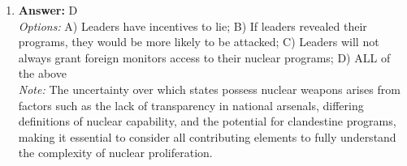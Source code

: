 \documentclass[12pt]{article}
\begin{document}
\begin{enumerate}[label=\arabic*.]
\\ \textit{Note:} The State Department is the primary federal agency responsible for overseeing and implementing U.S. foreign policy, making it the correct answer for this question.
\item \textbf{Answer:} D
\\ \textit{Options:} A) Leaders have incentives to lie; B) If leaders revealed their programs, they would be more likely to be attacked; C) Leaders will not always grant foreign monitors access to their nuclear programs; D) ALL of the above
\\ \textit{Note:} The uncertainty over which states possess nuclear weapons arises from factors such as the lack of transparency in national arsenals, differing definitions of nuclear capability, and the potential for clandestine programs, making it essential to consider all contributing elements to fully understand the complexity of nuclear proliferation.
\end{enumerate}
\end{document}

